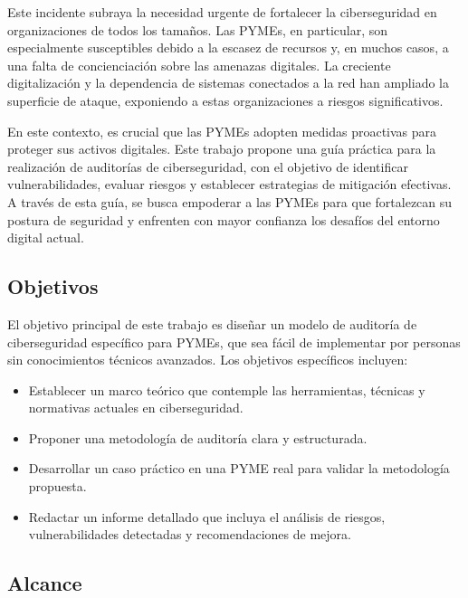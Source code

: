 \documentclass[a4paper, 10pt]{article}
\begin{document}
Este incidente subraya la necesidad urgente de fortalecer la ciberseguridad en organizaciones de todos los tamaños. Las PYMEs, en particular, son especialmente susceptibles debido a la escasez de recursos y, en muchos casos, a una falta de concienciación sobre las amenazas digitales. La creciente digitalización y la dependencia de sistemas conectados a la red han ampliado la superficie de ataque, exponiendo a estas organizaciones a riesgos significativos.
\par\vspace{0.5cm}

En este contexto, es crucial que las PYMEs adopten medidas proactivas para proteger sus activos digitales. Este trabajo propone una guía práctica para la realización de auditorías de ciberseguridad, con el objetivo de identificar vulnerabilidades, evaluar riesgos y establecer estrategias de mitigación efectivas. A través de esta guía, se busca empoderar a las PYMEs para que fortalezcan su postura de seguridad y enfrenten con mayor confianza los desafíos del entorno digital actual.

\clearpage



\subsection{Objetivos}

El objetivo principal de este trabajo es dise\~nar un modelo de auditor\'ia de ciberseguridad espec\'ifico para PYMEs, que sea f\'acil de implementar por personas sin conocimientos t\'ecnicos avanzados. Los objetivos espec\'ificos incluyen:

\begin{itemize}
    \item Establecer un marco te\'orico que contemple las herramientas, t\'ecnicas y normativas actuales en ciberseguridad.
    \item Proponer una metodolog\'ia de auditor\'ia clara y estructurada.
    \item Desarrollar un caso pr\'actico en una PYME real para validar la metodolog\'ia propuesta.
    \item Redactar un informe detallado que incluya el an\'alisis de riesgos, vulnerabilidades detectadas y recomendaciones de mejora.
\end{itemize}

\subsection{Alcance}
\end{document}
